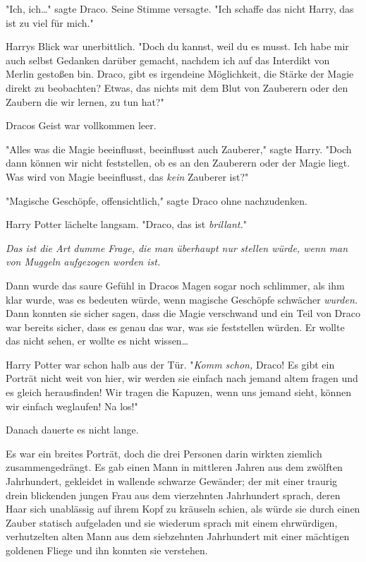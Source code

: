 {"Ich, ich…" sagte Draco. Seine Stimme versagte. "Ich schaffe das nicht Harry, das ist zu viel für mich."

Harrys Blick war unerbittlich. "Doch du kannst, weil du es musst. Ich habe mir auch selbst Gedanken darüber gemacht, nachdem ich auf das Interdikt von Merlin gestoßen bin. Draco, gibt es irgendeine Möglichkeit, die Stärke der Magie direkt zu beobachten? Etwas, das nichts mit dem Blut von Zauberern oder den Zaubern die wir lernen, zu tun hat?"

Dracos Geist war vollkommen leer.

"Alles was die Magie beeinflusst, beeinflusst auch Zauberer," sagte Harry. "Doch dann können wir nicht feststellen, ob es an den Zauberern oder der Magie liegt. Was wird von Magie beeinflusst, das \emph{kein} Zauberer ist?"

"Magische Geschöpfe, offensichtlich," sagte Draco ohne nachzudenken.

Harry Potter lächelte langsam. "Draco, das ist \emph{brillant.}"

\emph{Das ist die Art dumme Frage, die man überhaupt nur stellen würde, wenn man von Muggeln aufgezogen worden ist.}

Dann wurde das saure Gefühl in Dracos Magen sogar noch schlimmer, als ihm klar wurde, was es bedeuten würde, wenn magische Geschöpfe schwächer \emph{wurden.} Dann konnten sie sicher sagen, dass die Magie verschwand und ein Teil von Draco war bereits sicher, dass es genau das war, was sie feststellen würden. Er wollte das nicht sehen, er wollte es nicht wissen…

Harry Potter war schon halb aus der Tür. "\emph{Komm schon,} Draco! Es gibt ein Porträt nicht weit von hier, wir werden sie einfach nach jemand altem fragen und es gleich herausfinden! Wir tragen die Kapuzen, wenn uns jemand sieht, können wir einfach weglaufen! Na los!"

\later

Danach dauerte es nicht lange.

Es war ein breites Porträt, doch die drei Personen darin wirkten ziemlich zusammengedrängt. Es gab einen Mann in mittleren Jahren aus dem zwölften Jahrhundert, gekleidet in wallende schwarze Gewänder; der mit einer traurig drein blickenden jungen Frau aus dem vierzehnten Jahrhundert sprach, deren Haar sich unablässig auf ihrem Kopf zu kräuseln schien, als würde sie durch einen Zauber statisch aufgeladen und sie wiederum sprach mit einem ehrwürdigen, verhutzelten alten Mann aus dem siebzehnten Jahrhundert mit einer mächtigen goldenen Fliege und ihn konnten sie verstehen.

}
